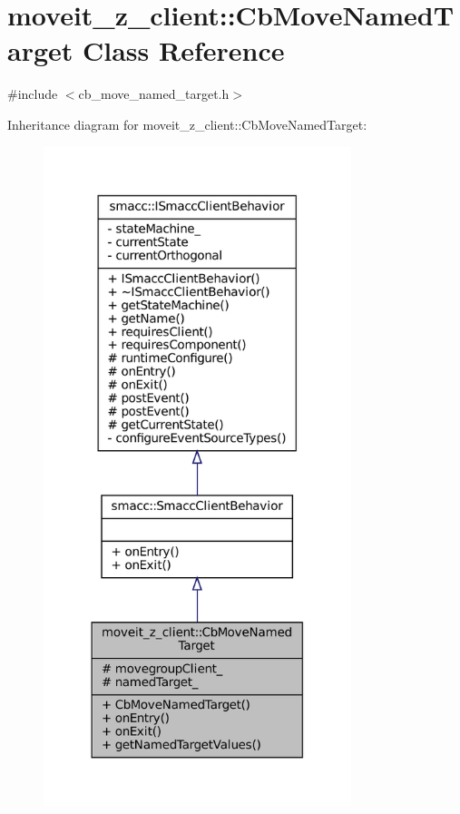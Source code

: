 \hypertarget{classmoveit__z__client_1_1CbMoveNamedTarget}{}\section{moveit\+\_\+z\+\_\+client\+:\+:Cb\+Move\+Named\+Target Class Reference}
\label{classmoveit__z__client_1_1CbMoveNamedTarget}


{\ttfamily \#include $<$cb\+\_\+move\+\_\+named\+\_\+target.\+h$>$}



Inheritance diagram for moveit\+\_\+z\+\_\+client\+:\+:Cb\+Move\+Named\+Target\+:
\nopagebreak
\begin{figure}[H]
\begin{center}
\leavevmode
\includegraphics[width=254pt]{classmoveit__z__client_1_1CbMoveNamedTarget__inherit__graph}
\end{center}
\end{figure}


